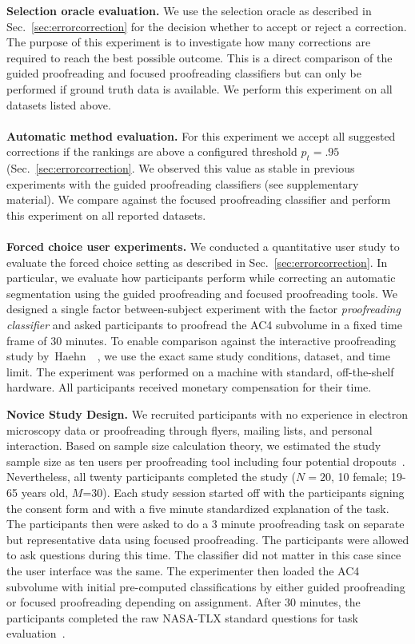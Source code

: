 \textbf{Selection oracle evaluation.} We use the selection oracle as described in Sec.~\ref{sec:errorcorrection} for the decision whether to accept or reject a correction. The purpose of this experiment is to investigate how many corrections are required to reach the best possible outcome. This is a direct comparison of the guided proofreading and focused proofreading classifiers but can only be performed if ground truth data is available. We perform this experiment on all datasets listed above.
\\~\\
\textbf{Automatic method evaluation.} For this experiment we accept all suggested corrections if the rankings are above a configured threshold $p_t=.95$ (Sec.~\ref{sec:errorcorrection}. We observed this value as stable in previous experiments with the guided proofreading classifiers (see supplementary material). We compare against the focused proofreading classifier and perform this experiment on all reported datasets.
\\~\\
\textbf{Forced choice user experiments.} We conducted a quantitative user study to evaluate the forced choice setting as described in Sec.~\ref{sec:errorcorrection}. In particular, we evaluate how participants perform while correcting an automatic segmentation using the guided proofreading and focused proofreading tools. We designed a single factor between-subject experiment with the factor \textit{proofreading classifier} and asked participants to proofread the AC4 subvolume in a fixed time frame of 30 minutes. To enable comparison against the interactive proofreading study by~Haehn~\etal~\cite{haehn_dojo_2014}, we use the exact same study conditions, dataset, and time limit. The experiment was performed on a machine with standard, off-the-shelf hardware. All participants received monetary compensation for their time.

\textbf{Novice Study Design.} We recruited participants with no experience in electron microscopy data or proofreading through flyers, mailing lists, and personal interaction. Based on sample size calculation theory, we estimated the study sample size as ten users per proofreading tool including four potential dropouts~\cite{samplesize1,samplesize2}. Nevertheless, all twenty participants completed the study ($N=20$, 10 female; 19-65 years old, $M$=30). Each study session started off with the participants signing the consent form and with a five minute standardized explanation of the task. The participants then were asked to do a 3 minute proofreading task on separate but representative data using focused proofreading. The participants were allowed to ask questions during this time. The classifier did not matter in this case since the user interface was the same. The experimenter then loaded the AC4 subvolume with initial pre-computed classifications by either guided proofreading or focused proofreading depending on assignment. After 30 minutes, the participants completed the raw NASA-TLX standard questions for task evaluation~\cite{NASATLX}.

